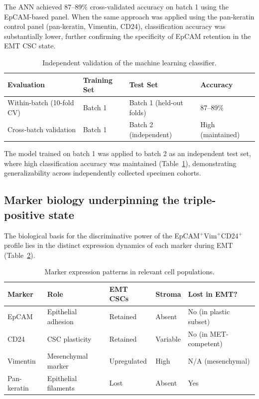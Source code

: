 \documentclass[11pt]{article}
\begin{document}
The ANN achieved 87--89\% cross-validated accuracy on batch 1 using the EpCAM-based panel. When the same approach was applied using the pan-keratin control panel (pan-keratin, Vimentin, CD24), classification accuracy was substantially lower, further confirming the specificity of EpCAM retention in the EMT CSC state.

\begin{table}[ht]
\centering
\caption{Independent validation of the machine learning classifier.}
\label{tab:validation}
\begin{tabular}{llll}
\toprule
Evaluation & Training Set & Test Set & Accuracy \\
\midrule
Within-batch (10-fold CV) & Batch 1 & Batch 1 (held-out folds) & 87--89\% \\
Cross-batch validation & Batch 1 & Batch 2 (independent) & High (maintained) \\
\bottomrule
\end{tabular}
\end{table}

The model trained on batch 1 was applied to batch 2 as an independent test set, where high classification accuracy was maintained (Table~\ref{tab:validation}), demonstrating generalizability across independently collected specimen cohorts.

\subsection{Marker biology underpinning the triple-positive state}

The biological basis for the discriminative power of the EpCAM$^{+}$Vim$^{+}$CD24$^{+}$ profile lies in the distinct expression dynamics of each marker during EMT (Table~\ref{tab:markers}).

\begin{table}[ht]
\centering
\caption{Marker expression patterns in relevant cell populations.}
\label{tab:markers}
\begin{tabular}{lllll}
\toprule
Marker & Role & EMT CSCs & Stroma & Lost in EMT? \\
\midrule
EpCAM & Epithelial adhesion & Retained & Absent & No (in plastic subset) \\
CD24 & CSC plasticity & Retained & Variable & No (in MET-competent) \\
Vimentin & Mesenchymal marker & Upregulated & High & N/A (mesenchymal) \\
Pan-keratin & Epithelial filaments & Lost & Absent & Yes \\
\bottomrule
\end{tabular}
\end{table}
\end{document}
